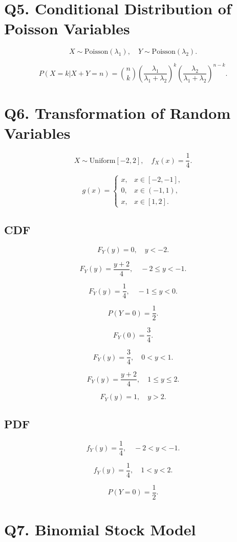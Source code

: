 \documentclass[12pt]{article}
\begin{document}
\section*{Q5. Conditional Distribution of Poisson Variables}

\[
X\sim \text{Poisson}(\lambda_1), \quad
Y\sim \text{Poisson}(\lambda_2).
\]

\[
P(X=k|X+Y=n)
=
\binom{n}{k}
\left(\frac{\lambda_1}{\lambda_1+\lambda_2}\right)^k
\left(\frac{\lambda_2}{\lambda_1+\lambda_2}\right)^{n-k}.
\]

\section*{Q6. Transformation of Random Variables}

\[
X\sim \text{Uniform}[-2,2], \quad f_X(x)=\frac14.
\]

\[
g(x)=
\begin{cases}
x, & x\in[-2,-1],\\
0, & x\in(-1,1),\\
x, & x\in[1,2].
\end{cases}
\]

\subsection*{CDF}

\[
F_Y(y)=0, \quad y<-2.
\]

\[
F_Y(y)=\frac{y+2}{4}, \quad -2\le y<-1.
\]

\[
F_Y(y)=\frac14, \quad -1\le y<0.
\]

\[
P(Y=0)=\frac12.
\]

\[
F_Y(0)=\frac34.
\]

\[
F_Y(y)=\frac34, \quad 0<y<1.
\]

\[
F_Y(y)=\frac{y+2}{4}, \quad 1\le y\le2.
\]

\[
F_Y(y)=1, \quad y>2.
\]

\subsection*{PDF}

\[
f_Y(y)=\frac14, \quad -2<y<-1.
\]

\[
f_Y(y)=\frac14, \quad 1<y<2.
\]

\[
P(Y=0)=\frac12.
\]

\section*{Q7. Binomial Stock Model}
\end{document}
